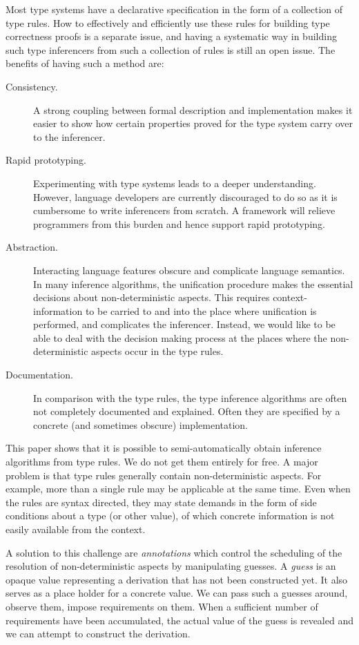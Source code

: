 \documentclass[preprint,natbib]{sigplanconf}
\begin{document}
Most type systems have a declarative specification in the form of a collection of type rules. How to effectively and efficiently use these rules for building type correctness proofs is a separate issue, and having a systematic way in building such type inferencers from such a collection of rules is still an open issue.
The benefits of having such a method are:

\begin{description}
\item[Consistency.] A strong coupling between formal description and implementation makes it easier to show how certain
  properties proved for the type system carry over to the inferencer.
\item[Rapid prototyping.] Experimenting with type systems leads to a deeper understanding. However,
  language developers are currently discouraged to do so as it is cumbersome to write inferencers from scratch. 
  A framework will relieve programmers from this burden and hence support rapid prototyping.
\item[Abstraction.] Interacting language features obscure and complicate language semantics. In many inference
  algorithms, the unification procedure makes the essential decisions about non-deterministic aspects. This requires context-information to
  be carried to and into the place where unification is performed, and complicates the inferencer. 
  Instead, we would like to be able to deal
  with the decision making process at the places where the non-deterministic aspects occur in the type rules.
\item[Documentation.] In comparison with the type rules, the type inference algorithms are often not completely documented and explained. Often they are specified by a concrete (and sometimes obscure) implementation.
\end{description}

This paper shows that it is possible to semi-automatically obtain inference
algorithms from type rules. We do not get them entirely for free. A
major problem is that type rules generally contain non-deterministic
aspects. For example, more than a single rule may be applicable at the
same time. Even when the rules are syntax directed, they may state
demands in the form of side conditions about a type (or other value),
of which concrete information is not easily available from the context.

A solution to this challenge are {\it annotations} which control the
scheduling of the resolution of non-deterministic aspects by
manipulating guesses. A {\it guess} is an opaque value representing a
derivation that has not been constructed yet.  It also serves as a place
holder for a concrete value. We can pass such a guesses around, observe
them, impose requirements on them. When a sufficient number of requirements
have been accumulated, the actual value of the guess is revealed and we can
attempt to construct the derivation.
\end{document}
